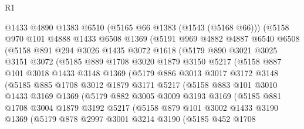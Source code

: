 \begin{lexlean}{R1}
\begin{coremodule}
        @1433
        @4890
        @1383
        @6510
        (@5165 @66 @1383 (@1543 (@5168 @66)))
        (@5158
          @970
          @101
          @4888
          @1433
          @6508
          @1369
          (@5191
            @969
            @4882
            @4887
            @6540
            @6508
            (@5158
              @891
              @294
              @3026
              @1435
              @3072
              @1618
              (@5179
                @890
                @3021
                @3025
                @3151
                @3072
                (@5185
                  @889
                  @1708
                  @3020
                  @1879
                  @3150
                  @5217
                  (@5158
                    @887
                    @101
                    @3018
                    @1433
                    @3148
                    @1369
                    (@5179
                      @886
                      @3013
                      @3017
                      @3172
                      @3148
                      (@5185
                        @885
                        @1708
                        @3012
                        @1879
                        @3171
                        @5217
                        (@5158
                          @883
                          @101
                          @3010
                          @1433
                          @3169
                          @1369
                          (@5179
                            @882
                            @3005
                            @3009
                            @3193
                            @3169
                            (@5185
                              @881
                              @1708
                              @3004
                              @1879
                              @3192
                              @5217
                              (@5158
                                @879
                                @101
                                @3002
                                @1433
                                @3190
                                @1369
                                (@5179
                                  @878
                                  @2997
                                  @3001
                                  @3214
                                  @3190
                                  (@5185
                                    @452
                                    @1708

\end{coremodule}
\end{lexlean}
